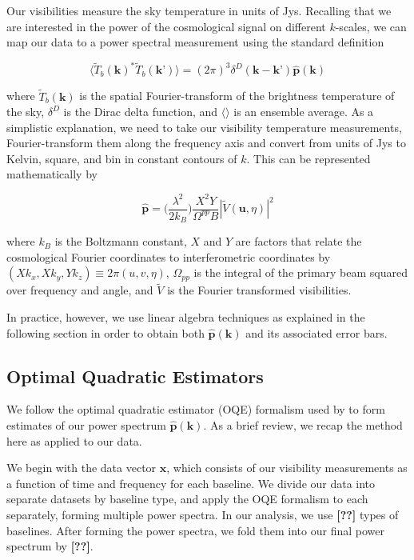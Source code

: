 \documentclass[preprint2,numberedappendix,tighten,twocolappendix]{aastex6}  %
\newcommand{\cc}[1]{{\color{purple} \textbf{[#1]}}}
\begin{document}
Our visibilities measure the sky temperature in units of Jys. Recalling that we are interested in the power of the cosmological signal on different $k$-scales, we can map our data to a power spectral measurement using the standard definition

\begin{equation}
\label{eq:ps}
\langle \tilde{T}_{b}(\textbf{k})^{*}\tilde{T}_{b}(\textbf{k'})\rangle = (2\pi)^{3} \delta^{D}(\textbf{k}-\textbf{k'})\hat{\textbf{p}}(\textbf{k})
\end{equation}

\noindent where $\tilde{T}_{b}(\textbf{k})$ is the spatial Fourier-transform of the brightness temperature of the sky, $\delta^{D}$ is the Dirac delta function, and $\langle \rangle$ is an ensemble average. As a simplistic explanation, we need to take our visibility temperature measurements, Fourier-transform them along the frequency axis and convert from units of Jys to Kelvin, square, and bin in constant contours of $k$. This can be represented mathematically by

\begin{equation}
\hat{\textbf{p}} = \Big(\frac{\lambda^{2}}{2k_{B}}\Big) \frac{X^{2}Y}{\Omega^{pp}B} | \tilde{V} (\textbf{u},\eta) |^{2}
\end{equation}

\noindent where $k_{B}$ is the Boltzmann constant, $X$ and $Y$ are factors that relate the cosmological Fourier coordinates to interferometric coordinates by $(Xk_{x},Xk_{y}, Yk_{z}) \equiv 2\pi(u,v,\eta)$, $\Omega_{pp}$ is the integral of the primary beam squared over frequency and angle, and $\tilde{V}$ is the Fourier transformed visibilities.

In practice, however, we use linear algebra techniques as explained in the following section in order to obtain both $\hat{\textbf{p}}(\textbf{k})$ and its associated error bars. 

\subsection{Optimal Quadratic Estimators}
\label{sec:OQE}

We follow the optimal quadratic estimator (OQE) formalism used by \citet{ali_et_al2015} to form estimates of our power spectrum $\hat{\textbf{p}}(\textbf{k})$. As a brief review, we recap the method here as applied to our data. 

We begin with the data vector $\textbf{x}$, which consists of our visibility measurements as a function of time and frequency for each baseline. We divide our data into separate datasets by baseline type, and apply the OQE formalism to each separately, forming multiple power spectra. In our analysis, we use \cc{??} types of baselines. After forming the power spectra, we fold them into our final power spectrum by \cc{??}.
\end{document}
